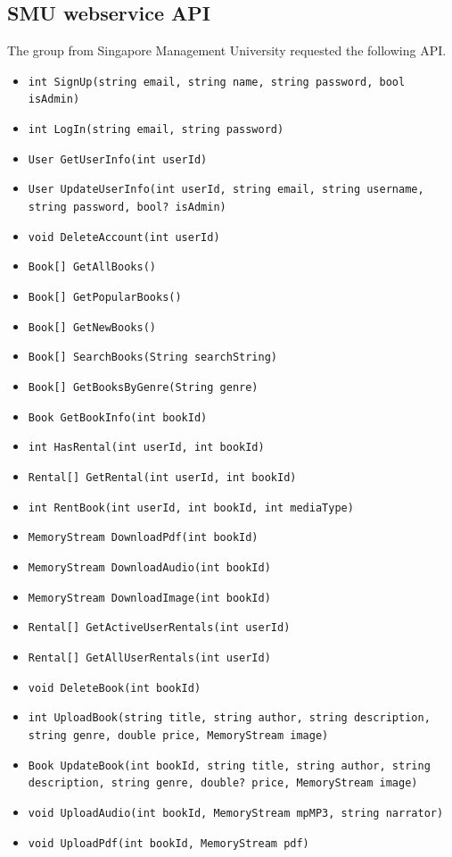 \documentclass[a4paper,11pt,report]{article}
\begin{document}
{\subsection{SMU webservice API}
The group from Singapore Management University requested the following API.
\begin{itemize}
	\item \texttt{int SignUp(string email, string name, string password, bool isAdmin)}
	\item \texttt{int LogIn(string email, string password)}
	\item \texttt{User GetUserInfo(int userId)}
	\item \texttt{User UpdateUserInfo(int userId, string email, string username, string password, bool? isAdmin)}
	\item \texttt{void DeleteAccount(int userId)}
	\item \texttt{Book[] GetAllBooks()}
	\item \texttt{Book[] GetPopularBooks()}
	\item \texttt{Book[] GetNewBooks()}
	\item \texttt{Book[] SearchBooks(String searchString)}
	\item \texttt{Book[] GetBooksByGenre(String genre)}
	\item \texttt{Book GetBookInfo(int bookId)}
	\item \texttt{int HasRental(int userId, int bookId)}
	\item \texttt{Rental[] GetRental(int userId, int bookId)}
	\item \texttt{int RentBook(int userId, int bookId, int mediaType)}
	\item \texttt{MemoryStream DownloadPdf(int bookId)}
	\item \texttt{MemoryStream DownloadAudio(int bookId)}
	\item \texttt{MemoryStream DownloadImage(int bookId)}
	\item \texttt{Rental[] GetActiveUserRentals(int userId)}
	\item \texttt{Rental[] GetAllUserRentals(int userId)}
	\item \texttt{void DeleteBook(int bookId)}
	\item \texttt{int UploadBook(string title, string author, string description, string genre, double price, MemoryStream image)}
	\item \texttt{Book UpdateBook(int bookId, string title, string author, string description, string genre, double? price, MemoryStream image)}
	\item \texttt{void UploadAudio(int bookId, MemoryStream mpMP3, string narrator)}
	\item \texttt{void UploadPdf(int bookId, MemoryStream pdf)}
\end{itemize}

}
\end{document}
